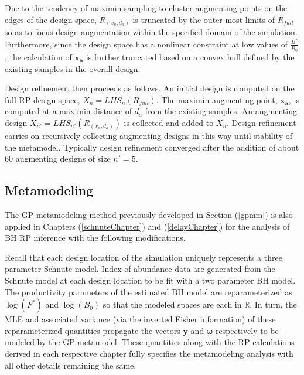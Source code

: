 %
Due to the tendency of maximin sampling to cluster augmenting points on the edges
of the design space, $R_{(x_a, d_a)}$ is truncated by the outer most limits of
$R_{full}$ so as to focus design augmentation within the specified domain of the
simulation. Furthermore, since the design space has a nonlinear constraint at low
values of $\frac{B^*}{B_0}$, the calculation of $\bm{x_a}$ is further truncated
based on a convex hull defined by the existing samples in the overall design.

%
Design refinement then proceeds as follows. An initial design is computed on the 
full RP design space, $X_{n} = LHS_{n}(R_{full})$. %
The maximin augmenting point, $\bm{x_a}$, is computed at a maximin distance of $d_a$ 
from the existing samples. An augmenting design $X_{n'} = LHS_{n'}(R_{(x_a, d_a)})$ 
is collected and added to $X_n$. Design refinement carries on recursively 
collecting augmenting designs in this way until %
stability of the metamodel. Typically design refinement converged after the 
addition of about 60 augmenting designs of size $n'=5$.

%
\subsection{Metamodeling}

%
The GP metamodeling method previously developed in Section (\ref{gpmm}) is 
also applied in Chapters (\ref{schnuteChapter}) and (\ref{delayChapter}) for the 
analysis of BH RP inference with the following modifications.

%
Recall that each design location of the simulation uniquely represents a three parameter 
Schnute model. Index of abundance data are generated from the Schnute model 
at each design location to be fit with a two parameter BH model.
The productivity parameters of the estimated BH model are reparameterized as 
$\log(F^*)$ and $\log(B_0)$ so that the modeled spaces are each in $\mathbb{R}$.
In turn, the MLE and associated variance (via the inverted Fisher information) 
of these reparameterized quantities propagate the vectors 
$\textbf{y}$ and $\bm{\omega}$ respectively to be modeled by the GP metamodel. 
These quantities along with the RP calculations derived in each respective chapter 
fully specifies the metamodeling analysis with all other details remaining the same. 

